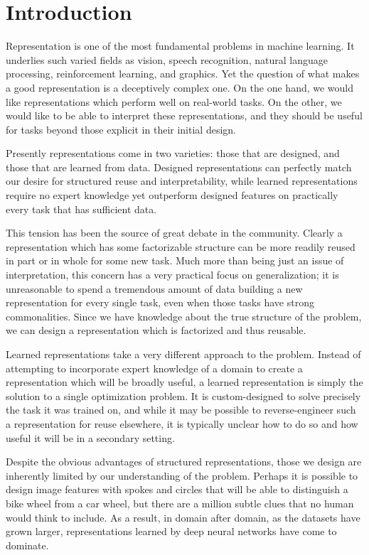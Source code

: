\documentclass[12pt,twoside]{mitthesis}
\begin{document}
\chapter{Introduction}\label{introduction}

Representation is one of the most fundamental problems in machine
learning. It underlies such varied fields as vision, speech recognition,
natural language processing, reinforcement learning, and graphics. Yet
the question of what makes a good representation is a deceptively
complex one. On the one hand, we would like representations which
perform well on real-world tasks. On the other, we would like to be able
to interpret these representations, and they should be useful for tasks
beyond those explicit in their initial design.

Presently representations come in two varieties: those that are
designed, and those that are learned from data. Designed representations
can perfectly match our desire for structured reuse and
interpretability, while learned representations require no expert
knowledge yet outperform designed features on practically every task
that has sufficient data.

This tension has been the source of great debate in the community.
Clearly a representation which has some factorizable structure can be
more readily reused in part or in whole for some new task. Much more
than being just an issue of interpretation, this concern has a very
practical focus on generalization; it is unreasonable to spend a
tremendous amount of data building a new representation for every single
task, even when those tasks have strong commonalities. Since we have
knowledge about the true structure of the problem, we can design a
representation which is factorized and thus reusable.

Learned representations take a very different approach to the problem.
Instead of attempting to incorporate expert knowledge of a domain to
create a representation which will be broadly useful, a learned
representation is simply the solution to a single optimization problem.
It is custom-designed to solve precisely the task it was trained on, and
while it may be possible to reverse-engineer such a representation for
reuse elsewhere, it is typically unclear how to do so and how useful it
will be in a secondary setting.

Despite the obvious advantages of structured representations, those we
design are inherently limited by our understanding of the problem.
Perhaps it is possible to design image features with spokes and circles
that will be able to distinguish a bike wheel from a car wheel, but
there are a million subtle clues that no human would think to include.
As a result, in domain after domain, as the datasets have grown larger,
representations learned by deep neural networks have come to dominate.
\end{document}
